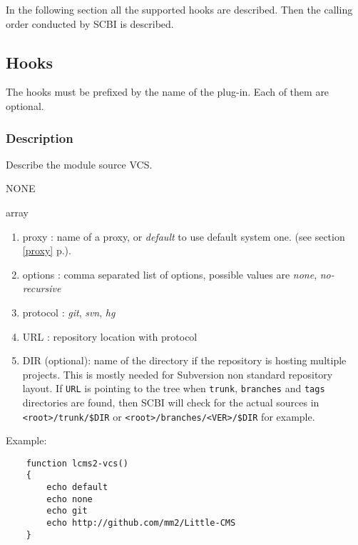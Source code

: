 \documentclass[a4paper,12pt,twoside]{article}
\newcommand{\code}[1]{\texttt{#1}}
\renewcommand{\emph}[1]{\textit{#1}}
\newcommand{\seeref}[1]{see section \ref{#1} p.\pageref{#1}}
\begin{document}
In the following section all the supported hooks are described. Then the calling order conducted by SCBI is described.

\subsection{Hooks}

The hooks must be prefixed by the name of the plug-in. Each of them are optional.

\subsubsection{Description}

\begin{description}[font=\large\texttt]

	\item[<module>-vcs] Describe the module source VCS.
	\begin{description}[font=\textit,style=standard]
		\item[parameter] \tabto{2cm} NONE
		\item[return] \tabto{2cm} array
		\begin{enumerate}
			\item proxy : name of a proxy, or \emph{default} to use default system one. (\seeref{proxy}).
			\item options : comma separated list of options, possible values are \emph{none}, \emph{no-recursive}
			\item protocol : \emph{git}, \emph{svn}, \emph{hg}
			\item URL : repository location with protocol
			\item DIR (optional): name of the directory if the repository is hosting multiple projects. This is mostly needed for Subversion non standard repository layout. If \code{URL} is pointing to the tree when \code{trunk}, \code{branches} and \code{tags} directories are found, then SCBI will check for the actual sources in \code{<root>/trunk/\$DIR} or \code{<root>/branches/<VER>/\$DIR} for example.
		\end{enumerate}
	\end{description}

	Example:
	\begin{lstlisting}
	function lcms2-vcs()
	{
		echo default
		echo none
		echo git
		echo http://github.com/mm2/Little-CMS
	}
	\end{lstlisting}


\end{description}
\end{document}
